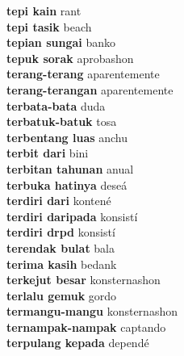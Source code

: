 \textbf{ tepi kain  } rant \\
\textbf{ tepi tasik  } beach \\
\textbf{ tepian sungai  } banko \\
\textbf{ tepuk sorak  } aprobashon \\
\textbf{ terang-terang  } aparentemente \\
\textbf{ terang-terangan  } aparentemente \\
\textbf{ terbata-bata  } duda \\
\textbf{ terbatuk-batuk  } tosa \\
\textbf{ terbentang luas  } anchu \\
\textbf{ terbit dari  } bini \\
\textbf{ terbitan tahunan  } anual \\
\textbf{ terbuka hatinya  } deseá \\
\textbf{ terdiri dari  } kontené \\
\textbf{ terdiri daripada  } konsistí \\
\textbf{ terdiri drpd  } konsistí \\
\textbf{ terendak bulat  } bala \\
\textbf{ terima kasih  } bedank \\
\textbf{ terkejut besar  } konsternashon \\
\textbf{ terlalu gemuk  } gordo \\
\textbf{ termangu-mangu  } konsternashon \\
\textbf{ ternampak-nampak  } captando \\
\textbf{ terpulang kepada  } dependé \\

